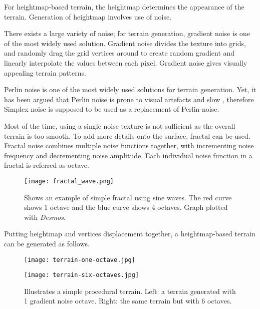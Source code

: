 \documentclass[oneside, a4paper]{report}
\begin{document}
    For heightmap-based terrain, the heightmap determines the appearance of the terrain. Generation of heightmap involves use of noise.

    There exists a large variety of noise; for terrain generation, gradient noise is one of the most widely used solution. Gradient noise divides the texture into grids, and randomly drag the grid vertices around to create random gradient and linearly interpolate the values between each pixel. Gradient noise gives visually appealing terrain patterns.

    Perlin noise \cite{perlin_noise} is one of the most widely used solutions for terrain generation. Yet, it has been argued that Perlin noise is prone to visual artefacts and slow \cite{improved_perlin}, therefore Simplex noise \cite{simplex_noise} is supposed to be used as a replacement of Perlin noise.

    Most of the time, using a single noise texture is not sufficient as the overall terrain is too smooth. To add more details onto the surface, fractal can be used. Fractal noise combines multiple noise functions together, with incrementing noise frequency and decrementing noise amplitude. Each individual noise function in a fractal is referred as octave.

    \begin{figure}[H]
        \texttt{[image: fractal\_wave.png]}
        \caption{Shows an example of simple fractal using sine waves. The red curve shows 1 octave and the blue curve shows 4 octaves. Graph plotted with \textit{Desmos}.}
    \end{figure}

    Putting heightmap and vertices displacement together, a heightmap-based terrain can be generated as follows.

    \begin{figure}[H]
        \center
        \begin{minipage}{0.48\textwidth}
            \texttt{[image: terrain-one-octave.jpg]}
        \end{minipage}
        \begin{minipage}{0.48\textwidth}
            \texttt{[image: terrain-six-octaves.jpg]}
        \end{minipage}
        \caption{Illustrates a simple procedural terrain. Left: a terrain generated with 1 gradient noise octave. Right: the same terrain but with 6 octaves.}
        \label{classic_terrain}
    \end{figure}
\end{document}
